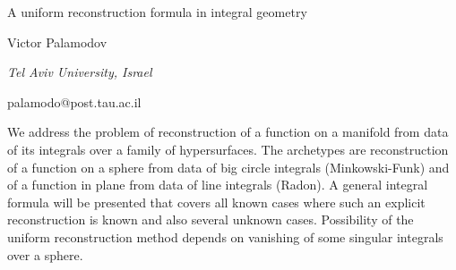 \documentclass[10pt,a4paper]{article}
\begin{document}
\begin{center}

{\Large A uniform reconstruction formula in integral geometry}

\bigskip

{\sc Victor Palamodov}

{\small\it Tel Aviv University, Israel}

{\small\rm palamodo@post.tau.ac.il}


\end{center}

\bigskip

We address the problem of reconstruction of a function on a manifold
from data of its integrals over a family of hypersurfaces. The
archetypes are reconstruction of a function on a sphere from data of big
circle integrals  (Minkowski-Funk) and of a function in plane from
data of line integrals (Radon).
A general integral formula will be presented that covers all known
cases where such an explicit reconstruction is known and also several
unknown cases. Possibility of the uniform reconstruction method
depends on vanishing of some singular integrals over a sphere.

\bigskip
\end{document}

